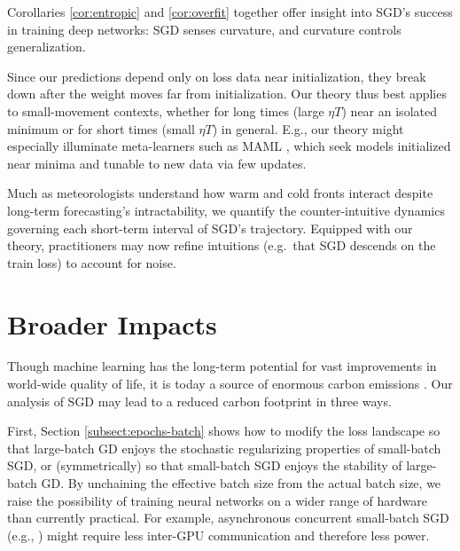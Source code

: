 \documentclass{article}
\theoremstyle{plain}
\theoremstyle{definition}
\begin{document}

        Corollaries \ref{cor:entropic} and \ref{cor:overfit} together offer
        insight into SGD's success in training deep networks: SGD senses
        curvature, and curvature controls generalization.

        Since our predictions depend only on loss data near initialization,
        they break down after the weight moves far from initialization.  Our
        theory thus best applies to small-movement contexts, whether for long
        times (large $\eta T$) near an isolated minimum or for short times
        (small $\eta T$) in general.  E.g., our theory might especially
        illuminate meta-learners such as MAML \citep{fi17}, which seek models
        initialized near minima and tunable to new data via few updates.

        Much as meteorologists understand how warm and cold fronts interact
        despite long-term forecasting's intractability, we quantify the
        counter-intuitive dynamics governing each short-term interval of SGD's
        trajectory.  Equipped with our theory, practitioners may now
        refine intuitions (e.g.\ that SGD descends on the train loss) to
        account for noise.
       


\section*{Broader Impacts}

    Though machine learning has the long-term potential for vast improvements
    in world-wide quality of life, it is today a source of enormous carbon
    emissions \citep{st19}.  Our analysis of SGD may lead to a reduced carbon
    footprint in three ways. 
     
    First, Section \ref{subsect:epochs-batch} shows how to modify the loss
    landscape so that large-batch GD enjoys the stochastic regularizing
    properties of small-batch SGD, or (symmetrically) so that small-batch SGD
    enjoys the stability of large-batch GD.  By unchaining the effective batch
    size from the actual batch size, we raise the possibility of training
    neural networks on a wider range of hardware than currently practical.  For
    example, asynchronous concurrent small-batch SGD (e.g., \cite{ni11}) might
    require less inter-GPU communication and therefore less power.
     
\end{document}
